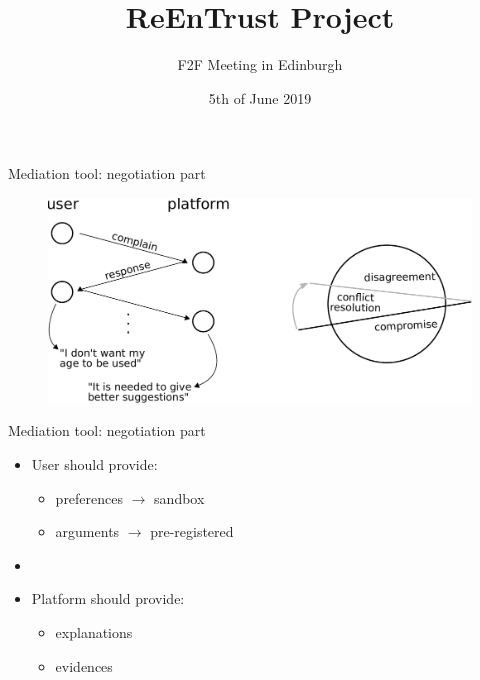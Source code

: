 \documentclass[t,french,mathserif]{beamer}
\title{\huge ReEnTrust Project}
\author{\Large F2F Meeting in Edinburgh}
\date{5th of June 2019}
\begin{document}
\begin{frame}[plain]
\titlepage
\end{frame}


\begin{frame}{Mediation tool: negotiation part}
    \vspace*{8mm}
    \begin{figure}
        \includegraphics[scale=0.4]{negotiation.pdf}
    \end{figure}
\end{frame}

\begin{frame}{Mediation tool: negotiation part}
    \begin{itemize}
        \item User should provide:
        \begin{itemize}
            \item preferences $\rightarrow$ sandbox
            \item arguments $\rightarrow$ pre-registered
        \end{itemize}
        \item[]
        \item Platform should provide:
        \begin{itemize}
            \item explanations
            \item evidences
        \end{itemize}
    \end{itemize}
\end{frame}
\end{document}
